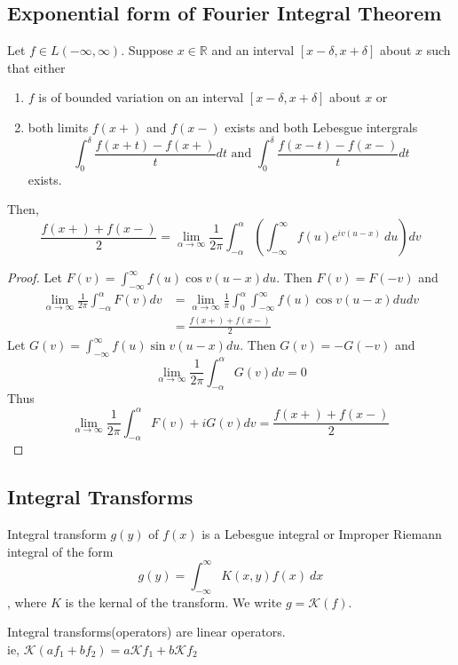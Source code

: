 \subsection{Exponential form of Fourier Integral Theorem}
	Let \( f \in L(-\infty,\infty) \). Suppose \( x \in \mathbb{R} \) and an interval $[x-\delta,x+\delta]$ about $x$ such that either 
	\begin{enumerate}
		\item $f$ is of bounded variation on an interval $[x-\delta,x+\delta]$ about $x$ or
		\item both limits $f(x+)$ and $f(x-)$ exists and both Lebesgue intergrals
			\[ \int_0^\delta \frac{f(x+t)-f(x+)}{t} dt \text{ and }\int_0^\delta \frac{f(x-t)-f(x-)}{t} dt \]
			exists.
	\end{enumerate}
	Then, 
	\[ \frac{f(x+)+f(x-)}{2} = \lim_{\alpha \to \infty} \frac{1}{2\pi} \int_{-\alpha}^\alpha \left( \int_{-\infty}^\infty f(u) e^{iv(u-x)}\ du\right) dv \]
	\begin{proof}
		Let \( F(v) = \int_{-\infty}^\infty f(u) \cos v(u-x) du \). Then \( F(v) = F(-v) \) and 
		\begin{align*}
			\lim_{\alpha \to \infty} \frac{1}{2\pi} \int_{-\alpha}^\alpha F(v) dv
			& = \lim_{\alpha \to \infty} \frac{1}{\pi} \int_0^\alpha \int_{-\infty}^\infty f(u) \cos v(u-x) du dv\\
			& = \frac{f(x+)+f(x-)}{2}
		\end{align*}
		Let \( G(v) = \int_{-\infty}^\infty f(u) \sin v(u-x) du \). Then \( G(v) = -G(-v) \) and
		\[ \lim_{\alpha \to \infty} \frac{1}{2\pi} \int_{-\alpha}^\alpha G(v) dv = 0 \]
		Thus 
		\[ \lim_{\alpha \to \infty} \frac{1}{2\pi} \int_{-\alpha}^\alpha F(v) + iG(v) dv = \frac{f(x+)+f(x-)}{2} \]
	\end{proof}

\subsection{Integral Transforms}
\begin{definition}
	Integral transform $g(y)$ of $f(x)$ is a Lebesgue integral or Improper Riemann integral of the form
	\[ g(y) = \int_{-\infty}^\infty K(x,y) f(x)\ dx \], where $K$ is the kernal of the transform. We write \( g = \mathscr{K}(f) \).
\end{definition}

\begin{remark}
	Integral transforms(operators) are linear operators.\\
	 ie, \( \mathscr{K}(af_1 + bf_2) = a\mathscr{K}f_1 + b\mathscr{K}f_2 \)
\end{remark}


